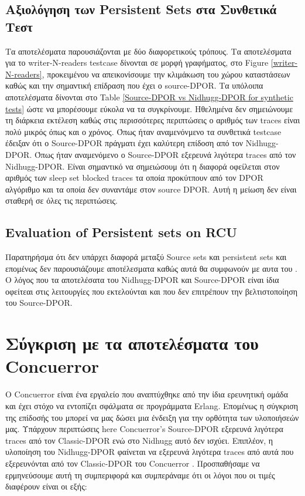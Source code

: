 \subsection{Αξιολόγηση των Persistent Sets στα Συνθετικά Τεστ}
Τα αποτελέσματα παρουσιάζονται με δύο διαφορετικούς τρόπους. Τα αποτελέσματα για το writer-N-readers testcase δίνονται σε μορφή γραφήματος, 
στο Figure \ref{writer-N-readers}, προκειμένου να απεικονίσουμε την κλιμάκωση του χώρου καταστάσεων καθώς
και την σημαντική επίδραση που έχει ο source-DPOR. Τα υπόλοιπα αποτελέσματα δίνονται στο Table \ref{Source-DPOR vs Nidhugg-DPOR for synthetic tests} 
ώστε να μπορέσουμε εύκολα να τα συγκρίνουμε. Ηθελημένα δεν σημειώνουμε τη διάρκεια εκτέλεση καθώς στις περισσότερες περιπτώσεις ο αριθμός
των traces είναι πολύ μικρός όπως και ο χρόνος.
Όπως ήταν αναμενόνμενο τα συνθετικά testcase έδειξαν ότι ο Source-DPOR πράγματι έχει καλύτερη επίδοση από τον
Nidhugg-DPOR. Όπως ήταν αναμενόμενο ο Source-DPOR εξερευνά λιγότερα traces από τον Nidhugg-DPOR. Είναι σημαντικό να
σημειώσουμ ότι η διαφορά οφείλεται στον αριθμός των sleep set blocked traces τα οποία προκύτπουν από τον DPOR αλγόριθμο 
και τα οποία δεν συναντάμε στον source DPOR. Αυτή η μείωση δεν είναι σταθερή σε όλες τις περιπτώσεις.



\subsection{Evaluation of Persistent sets on RCU}
Παρατηρήσμα ότι δεν υπάρχει διαφορά μεταξύ Source sets και persistent sets και επομένως δεν παρουσιάζουμε αποτέλεσματα
καθώς αυτά θα συμφωνούν με αυτα του \cite{Spin}. Ο λόγος που τα αποτελέσατα του Nidhugg-DPOR και Source-DPOR είναι ίδια οφείτεαι 
στις λειτουργίες που εκτελούνται και που δεν επιτρέπουν την βελτιστοποίηση του Source-DPOR.

\section{Σύγκριση με τα αποτελέσματα του Concuerror}
Ο Concuerror είναι ένα εργαλείο που αναπτύχθηκε από την ίδια ερευνητική ομάδα και έχει στόχο να εντοπίζει σφάλματα
σε προγράμματα Erlang. Επομένως η σύγκριση της επίδοσής του μπορεί να μας δώσει μια ένδειξη για την ορθότητα των
υλοποιήσεών μας.
Υπάρχουν περιπτώσεις here Concuerror's Source-DPOR εξερευνά λιγότερα traces από τον Classic-DPOR ενώ στο Nidhugg αυτό δεν ισχύει.
Επιπλέον, η υλοποίηση του Nidhugg-DPOR φαίνεται να εξερευνά λιγότερα traces από αυτά που εξερευνόνται από τον
Classic-DPOR του Concuerror \cite{AbdullaAronisJohnssonSagonasDPOR2014}. Προσπαθήσαμε να ερμηνεύσουμε αυτή τη συμπεριφορά και συμπεράναμε
ότι οι λόγοι που οι τιμές διαφέρουν είναι οι εξής:

